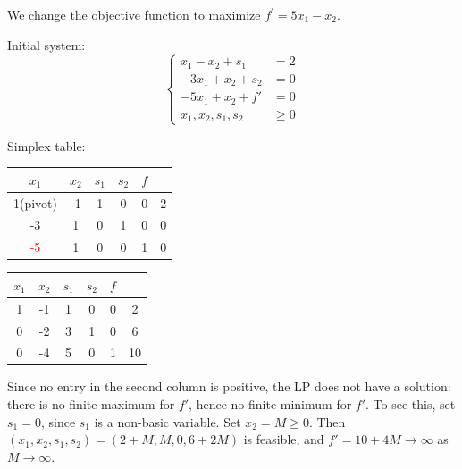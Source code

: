 \begin{solution}
    We change the objective function to maximize $f^{\prime}=5x_1 - x_2$.

    Initial system: 
    \begin{equation*}
        \left\lbrace \begin{array}{ll}
          x_1 - x_2 + s_1   &= 2  \\
           -3x_1 +x_2 + s_2  &= 0 \\
           -5x_1 + x_2 + f' & =0 \\
           x_1, x_2, s_1, s_2 &\ge 0
        \end{array}\right.
    \end{equation*}

    Simplex table:

    \begin{center}
    \begin{tabular}{ccccc|c}
    $x_1$ & $x_2$ & $s_1$ & $s_2$ & $f$ & \\
    \hline
    1(pivot) & -1 & 1 & 0 & 0 & 2\\
    -3 & 1 & 0 & 1 & 0 & 0\\
    \hline
    \textcolor{red}{-5} & 1 & 0 & 0 & 1 & 0\\
    \hline
    \end{tabular}
    \end{center}

    \begin{center}
    \begin{tabular}{ccccc|c}
    $x_1$ & $x_2$ & $s_1$ & $s_2$ & $f$ & \\
    \hline
    1 & -1 & 1 & 0 & 0 & 2\\
    0 & -2 & 3 & 1 & 0 & 6\\
    \hline
    0 & -4 & 5 & 0 & 1 & 10\\
    \hline
    \end{tabular}
    \end{center}

    Since no entry in the second column is positive, the LP does not have a solution: there is no finite maximum for $f'$, hence no finite minimum for $f'$. To see this, set $s_1 = 0$, since $s_1$ is a non-basic variable. Set $x_2 = M\ge 0$. Then $(x_1, x_2, s_1, s_2) = (2+M, M, 0, 6+2M)$ is feasible, and $f' = 10+4M\to\infty$ as $M\to\infty$.


\end{solution}
